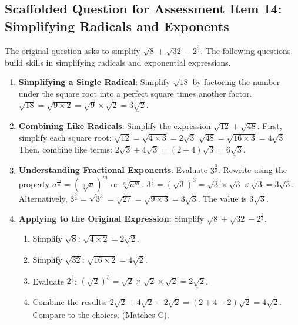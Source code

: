 \documentclass[12pt]{article}
\begin{document}
\subsection*{Scaffolded Question for Assessment Item 14: Simplifying Radicals and Exponents}
The original question asks to simplify \( \sqrt{8} + \sqrt{32} - 2^{\frac{3}{2}} \). The following questions build skills in simplifying radicals and exponential expressions.

\begin{enumerate}[label=14.\arabic*]
    \item \textbf{Simplifying a Single Radical}: Simplify \( \sqrt{18} \) by factoring the number under the square root into a perfect square times another factor.
    \( \sqrt{18} = \sqrt{9 \times 2} = \sqrt{9} \times \sqrt{2} = \underline{3\sqrt{2}} \).
    \item \textbf{Combining Like Radicals}: Simplify the expression \( \sqrt{12} + \sqrt{48} \).
    First, simplify each square root:
    \( \sqrt{12} = \sqrt{4 \times 3} = 2\sqrt{3} \)
    \( \sqrt{48} = \sqrt{16 \times 3} = 4\sqrt{3} \)
    Then, combine like terms: \( 2\sqrt{3} + 4\sqrt{3} = (2+4)\sqrt{3} = \underline{6\sqrt{3}} \).
    \item \textbf{Understanding Fractional Exponents}: Evaluate \( 3^{\frac{3}{2}} \).
    Rewrite using the property \( a^{\frac{m}{n}} = (\sqrt[n]{a})^m \) or \( \sqrt[n]{a^m} \).
    \( 3^{\frac{3}{2}} = (\sqrt{3})^3 = \sqrt{3} \times \sqrt{3} \times \sqrt{3} = 3\sqrt{3} \).
    Alternatively, \( 3^{\frac{3}{2}} = \sqrt{3^3} = \sqrt{27} = \sqrt{9 \times 3} = 3\sqrt{3} \).
    The value is \underline{\(3\sqrt{3}\)}.
    \item \textbf{Applying to the Original Expression}: Simplify \( \sqrt{8} + \sqrt{32} - 2^{\frac{3}{2}} \).
    \begin{enumerate}[label=\alph*)]
        \item Simplify \( \sqrt{8} \): \( \sqrt{4 \times 2} = \underline{2\sqrt{2}} \).
        \item Simplify \( \sqrt{32} \): \( \sqrt{16 \times 2} = \underline{4\sqrt{2}} \).
        \item Evaluate \( 2^{\frac{3}{2}} \): \( (\sqrt{2})^3 = \sqrt{2} \times \sqrt{2} \times \sqrt{2} = \underline{2\sqrt{2}} \).
        \item Combine the results: \( 2\sqrt{2} + 4\sqrt{2} - 2\sqrt{2} = (2+4-2)\sqrt{2} = \underline{4\sqrt{2}} \).
        Compare to the choices. (Matches C).
    \end{enumerate}
\end{enumerate}
\end{document}

